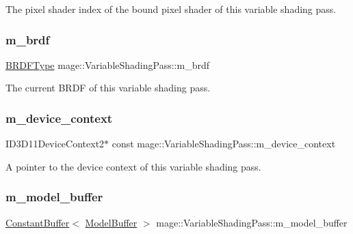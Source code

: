 The pixel shader index of the bound pixel shader of this variable shading pass. \hypertarget{classmage_1_1_variable_shading_pass_ac6147f2068fd7727fe2d78584ff68767}{}\label{classmage_1_1_variable_shading_pass_ac6147f2068fd7727fe2d78584ff68767} 
\subsubsection{\texorpdfstring{m\+\_\+brdf}{m\_brdf}}
{\footnotesize\ttfamily \hyperlink{namespacemage_ae7a7a03a7b34d7e2689689bb8295cd38}{B\+R\+D\+F\+Type} mage\+::\+Variable\+Shading\+Pass\+::m\+\_\+brdf\hspace{0.3cm}{\ttfamily [private]}}

The current B\+R\+DF of this variable shading pass. \hypertarget{classmage_1_1_variable_shading_pass_afff786ea38b64ba069866fdd6b525ba7}{}\label{classmage_1_1_variable_shading_pass_afff786ea38b64ba069866fdd6b525ba7} 
\subsubsection{\texorpdfstring{m\+\_\+device\+\_\+context}{m\_device\_context}}
{\footnotesize\ttfamily I\+D3\+D11\+Device\+Context2$\ast$ const mage\+::\+Variable\+Shading\+Pass\+::m\+\_\+device\+\_\+context\hspace{0.3cm}{\ttfamily [private]}}

A pointer to the device context of this variable shading pass. \hypertarget{classmage_1_1_variable_shading_pass_ab83602f0ffa6c0a3519ffaa467ae113a}{}\label{classmage_1_1_variable_shading_pass_ab83602f0ffa6c0a3519ffaa467ae113a} 
\subsubsection{\texorpdfstring{m\+\_\+model\+\_\+buffer}{m\_model\_buffer}}
{\footnotesize\ttfamily \hyperlink{structmage_1_1_constant_buffer}{Constant\+Buffer}$<$ \hyperlink{structmage_1_1_model_buffer}{Model\+Buffer} $>$ mage\+::\+Variable\+Shading\+Pass\+::m\+\_\+model\+\_\+buffer\hspace{0.3cm}{\ttfamily [private]}}

